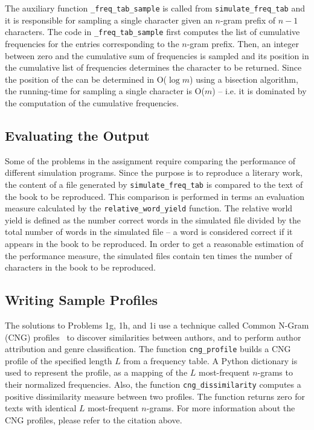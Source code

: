 \documentclass[conference]{IEEEtran}
\newcommand{\codeinline}[1]{{\fontsize{8}{0}\selectfont\texttt{#1}}}
\begin{document}
The auxiliary function \codeinline{\_freq\_tab\_sample} is called from \codeinline{simulate\_freq\_tab} and it is responsible for sampling a single character given an \mbox{$n$-gram} prefix of $n-1$ characters.
The code in \codeinline{\_freq\_tab\_sample} first computes the list of cumulative frequencies for the entries corresponding to the \mbox{$n$-gram} prefix.
Then, an integer between zero and the cumulative sum of frequencies is sampled and its position in the cumulative list of frequencies determines the character to be returned.
Since the position of the can be determined in O($\log m$) using a bisection algorithm, the running-time for sampling a single character is O($m$) 
-- i.e. it is dominated by the computation of the cumulative frequencies.


\subsection{Evaluating the Output}

Some of the problems in the assignment require comparing the performance of different simulation programs.
Since the purpose is to reproduce a literary work, the content of a file generated by \codeinline{simulate\_freq\_tab} is compared to the text of the book to be reproduced.
This comparison is performed in terms an evaluation measure calculated by the \codeinline{relative\_word\_yield} function.
The relative world yield is defined as the number correct words in the simulated file divided by the total number of words in the simulated file
-- a word is considered correct if it appears in the book to be reproduced.
In order to get a reasonable estimation of the performance measure, the simulated files contain ten times the number of characters in the book to be reproduced.


\subsection{Writing Sample Profiles}

The solutions to Problems 1g, 1h, and 1i use a technique called Common N-Gram (CNG) profiles~\cite{Keselj2003} to discover similarities between authors, and to perform author attribution and genre classification.
The function \codeinline{cng\_profile} builds a CNG profile of the specified length $L$ from a frequency table.
A Python dictionary is used to represent the profile, as a mapping of the $L$ most-frequent \mbox{\mbox{$n$-gram}s} to their normalized frequencies.
Also, the function \codeinline{cng\_dissimilarity} computes a positive dissimilarity measure between two profiles.
The function returns zero for texts with identical $L$ most-frequent \mbox{\mbox{$n$-gram}s}.
For more information about the CNG profiles, please refer to the citation above.
\end{document}
